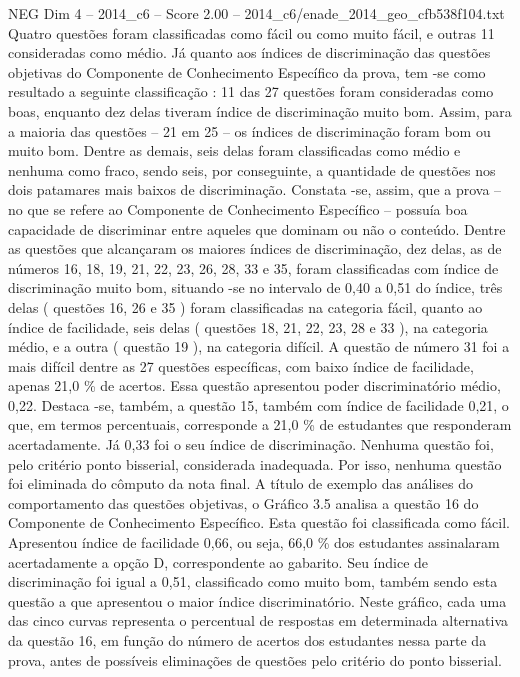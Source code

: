\begin{textsample}{NEG Dim 4 – 2014\_c6 – Score 2.00 – 2014\_c6/enade\_2014\_geo\_cfb538f104.txt}
Quatro questões foram classificadas como fácil ou como muito fácil, e outras 11 consideradas como médio.
Já quanto aos índices de discriminação das questões objetivas do Componente de Conhecimento Específico da prova, tem -se como resultado a seguinte classificação : 11 das 27 questões foram consideradas como boas, enquanto dez delas tiveram índice de discriminação muito bom.
Assim, para a maioria das questões – 21 em 25 – os índices de discriminação foram bom ou muito bom.
Dentre as demais, seis delas foram classificadas como médio e nenhuma como fraco, sendo seis, por conseguinte, a quantidade de questões nos dois patamares mais baixos de discriminação.
Constata -se, assim, que a prova – no que se refere ao Componente de Conhecimento Específico – possuía boa capacidade de discriminar entre aqueles que dominam ou não o conteúdo.
Dentre as questões que alcançaram os maiores índices de discriminação, dez delas, as de números 16, 18, 19, 21, 22, 23, 26, 28, 33 e 35, foram classificadas com índice de discriminação muito bom, situando -se no intervalo de 0,40 a 0,51 do índice, três delas ( questões 16, 26 e 35 ) foram classificadas na categoria fácil, quanto ao índice de facilidade, seis delas ( questões 18, 21, 22, 23, 28 e 33 ), na categoria médio, e a outra ( questão 19 ), na categoria difícil.
A questão de número 31 foi a mais difícil dentre as 27 questões específicas, com baixo índice de facilidade, apenas 21,0 \% de acertos.
Essa questão apresentou poder discriminatório médio, 0,22.
Destaca -se, também, a questão 15, também com índice de facilidade 0,21, o que, em termos percentuais, corresponde a 21,0 \% de estudantes que responderam acertadamente.
Já 0,33 foi o seu índice de discriminação.
Nenhuma questão foi, pelo critério ponto bisserial, considerada inadequada.
Por isso, nenhuma questão foi eliminada do cômputo da nota final.
A título de exemplo das análises do comportamento das questões objetivas, o Gráfico 3.5 analisa a questão 16 do Componente de Conhecimento Específico.
Esta questão foi classificada como fácil.
Apresentou índice de facilidade 0,66, ou seja, 66,0 \% dos estudantes assinalaram acertadamente a opção D, correspondente ao gabarito.
Seu índice de discriminação foi igual a 0,51, classificado como muito bom, também sendo esta questão a que apresentou o maior índice discriminatório.
Neste gráfico, cada uma das cinco curvas representa o percentual de respostas em determinada alternativa da questão 16, em função do número de acertos dos estudantes nessa parte da prova, antes de possíveis eliminações de questões pelo critério do ponto bisserial.

\end{textsample}
